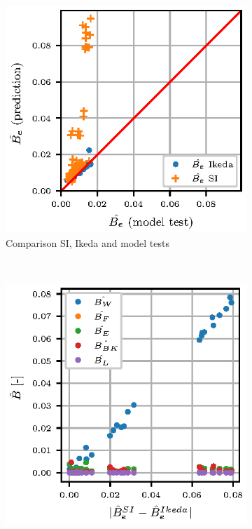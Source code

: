 \begin{figure}[H]
    \centering
    \begin{subfigure}[b]{0.4\textwidth}
        \centering
        \includegraphics[width=\textwidth]{figures/si_ikeda_model.eps}
        \caption{Comparison SI, Ikeda and model tests}
        \label{fig:si_ikeda_model}
    \end{subfigure}
    ~ %
    \begin{subfigure}[b]{0.4\textwidth}
        \centering
        \includegraphics[width=\textwidth]{figures/component_residual.eps}

\end{subfigure}
\end{figure}
